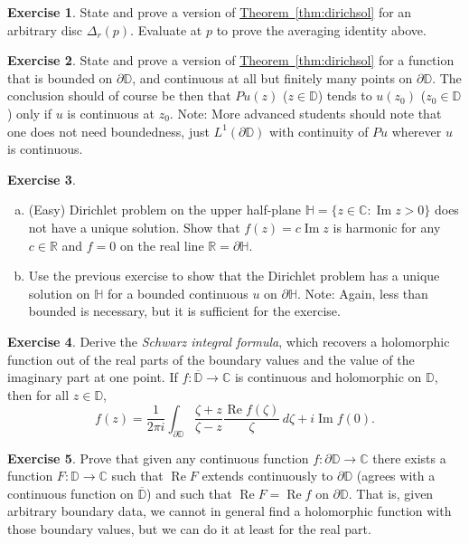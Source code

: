 \documentclass[12pt,openany]{book}
\renewcommand{\Re}{\operatorname{Re}}
\renewcommand{\Im}{\operatorname{Im}}
\newcommand{\C}{{\mathbb{C}}}
\newcommand{\R}{{\mathbb{R}}}
\newcommand{\D}{{\mathbb{D}}}
\newcommand{\bH}{{\mathbb{H}}}
\newcommand{\myindex}[1]{#1\index{#1}}
\theoremstyle{plain}
\theoremstyle{remark}
\theoremstyle{definition}
\newenvironment{exbox}{%
    \def\FrameCommand{\vrule width 1pt \relax\hspace{10pt}}%
    \MakeFramed{\advance\hsize-\width\FrameRestore}%
}{%
    \endMakeFramed
}
\newenvironment{exparts}{%
    \leavevmode\begin{enumerate}[a),noitemsep,topsep=0pt,parsep=0pt,partopsep=0pt]
}{%
    \end{enumerate}
}
\theoremstyle{exercise}
\newtheorem{exercise}{Exercise}[section]
\theoremstyle{example}
\newcommand{\thmref}[1]{\hyperref[#1]{Theorem~\ref*{#1}}}
\begin{document}
\begin{exbox}
\begin{exercise}
State and prove a version of \thmref{thm:dirichsol} for an arbitrary disc
$\Delta_r(p)$.  Evaluate at $p$ to prove the averaging identity above.
\end{exercise}

\begin{exercise}
State and prove a version of \thmref{thm:dirichsol} for a function that is
bounded on $\partial \D$, and continuous at all but finitely many points on
$\partial \D$.  The conclusion should of course be then that $Pu(z)$ ($z \in
\D$) tends
to $u(z_0)$ ($z_0 \in \D$) only if $u$ is continuous at $z_0$.
Note: More advanced students should note that one does not need boundedness,
just $L^1(\partial \D)$ with continuity of $Pu$ wherever $u$ is continuous.
\end{exercise}

\begin{exercise}
\begin{exparts}
\item (Easy)
Dirichlet problem on the upper half-plane $\bH = \{ z \in \C : \Im z > 0 \}$
does not have a unique solution.  Show that $f(z) = c \Im z$ is harmonic for
any $c \in \R$ and $f = 0$ on the real line $\R = \partial \bH$.
\item 
Use the previous exercise to show that the Dirichlet problem has a unique
solution on $\bH$ for a bounded continuous $u$ on $\partial \bH$.
Note: Again, less than bounded is
necessary, but it is sufficient for the exercise.
\end{exparts}
\end{exercise}

\begin{exercise}
Derive the \emph{\myindex{Schwarz integral formula}}, which recovers
a holomorphic function out of the real parts of the boundary values
and the value of the imaginary part at one point.
If $f \colon \overline{\D} \to \C$ is continuous and holomorphic on
$\D$, then for all $z \in \D$,
\begin{equation*}
f(z) =
\frac{1}{2\pi i}
\int_{\partial \D}
\frac{\zeta+z}{\zeta-z} \frac{\Re f(\zeta)}{\zeta} \, d\zeta
+ i \Im f(0) .
\end{equation*}
\end{exercise}

\begin{exercise}
Prove that given any continuous function $f \colon \partial \D \to \C$
there exists a function $F \colon \D \to \C$ such that $\Re F$ extends
continuously to $\partial \D$ (agrees with a continuous function on
$\overline{\D}$) and such that $\Re F = \Re f$ on $\partial \D$.
That is, given arbitrary boundary data, we cannot in general find a
holomorphic function with those boundary values, but we can do it at least
for the real part.
\end{exercise}
\end{exbox}
\end{document}
